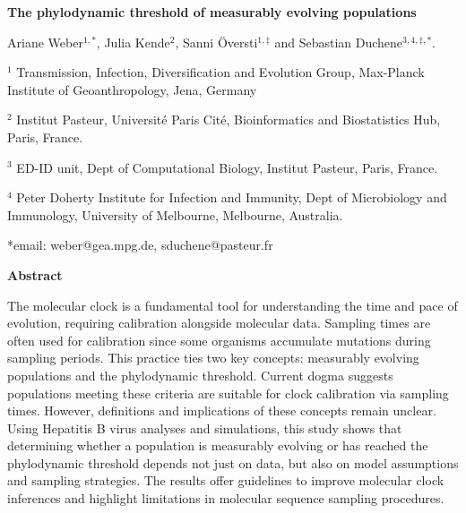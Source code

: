 \documentclass[11pt]{article}
\begin{document}
\begin{flushright}

\end{flushright}
\begin{center}
	\begin{LARGE}
	\textbf{The phylodynamic threshold of measurably evolving populations}
	\end{LARGE}

Ariane Weber$^{1,*}$, Julia Kende$^{2}$, Sanni Översti$^{1, \ddagger}$ and Sebastian Duchene$^{3,4,\ddagger, *}$.
\end{center}

$^{1}$ Transmission, Infection, Diversification and Evolution Group, Max-Planck Institute of Geoanthropology, Jena, Germany

$^{2}$ Institut Pasteur, Université Paris Cité, Bioinformatics and Biostatistics Hub, Paris, France.

$^{3}$ ED-ID unit, Dept of Computational Biology, Institut Pasteur, Paris, France.

$^{4}$ Peter Doherty Institute for Infection and Immunity, Dept of Microbiology and Immunology, University of Melbourne, Melbourne, Australia.


*email: weber@gea.mpg.de, sduchene@pasteur.fr
\newline

\begin{Large}
	\textbf{Abstract}
\end{Large}
The molecular clock is a fundamental tool for understanding the time and pace of evolution, requiring calibration alongside molecular data. Sampling times are often used for calibration since some organisms accumulate mutations during sampling periods. This practice ties two key concepts: measurably evolving populations and the phylodynamic threshold. Current dogma suggests populations meeting these criteria are suitable for clock calibration via sampling times. However, definitions and implications of these concepts remain unclear. Using Hepatitis B virus analyses and simulations, this study shows that determining whether a population is measurably evolving or has reached the phylodynamic threshold depends not just on data, but also on model assumptions and sampling strategies. The results offer guidelines to improve molecular clock inferences and highlight limitations in molecular sequence sampling procedures.
\end{document}
